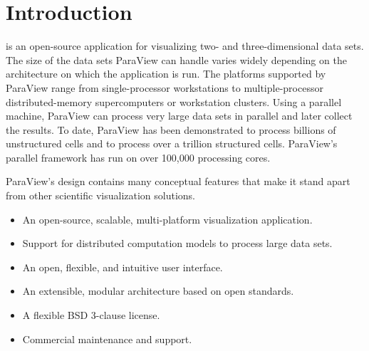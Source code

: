 \chapter{Introduction}
\label{chap:Introduction}

 is an open-source application for visualizing two- and
three-dimensional data sets.  The size of the data sets ParaView can handle
varies widely depending on the architecture on which the application is
run.  The platforms supported by ParaView range from single-processor
workstations to multiple-processor distributed-memory supercomputers or
workstation clusters.  Using a parallel machine, ParaView can process very
large data sets in parallel and later collect the results.  To date,
ParaView has been demonstrated to process billions of unstructured cells
and to process over a trillion structured cells.  ParaView's parallel
framework has run on over 100,000 processing cores.

ParaView's design contains many conceptual features that make it stand
apart from other scientific visualization solutions.

\begin{itemize}
\item An open-source, scalable, multi-platform visualization application.
\item Support for distributed computation models to process large data sets.
\item An open, flexible, and intuitive user interface.
\item An extensible, modular architecture based on open standards.
\item A flexible BSD 3-clause license.
\item Commercial maintenance and support.
\end{itemize}


